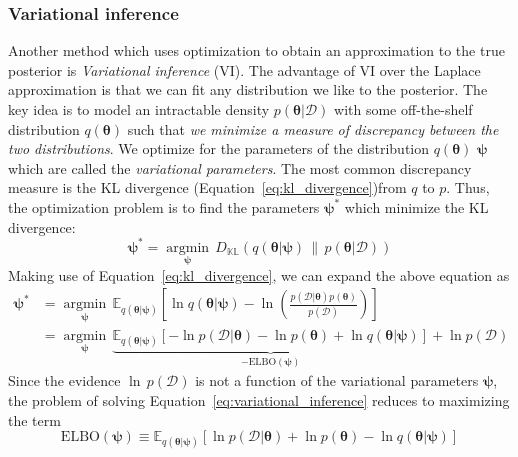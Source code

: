 \documentclass[12pt,dvipsnames]{report}
\renewcommand{\vec}[1]{\boldsymbol{\mathbf{#1}}}
\begin{document}
\subsubsection{Variational inference}
Another method which uses optimization to obtain an approximation to the true
posterior is \emph{Variational inference} (VI). The advantage of VI over the
Laplace approximation is that we can fit any distribution we like to the
posterior. The key idea is to model an intractable density $p(\vec{\theta}
    \lvert\mathcal{D})$ with some off-the-shelf distribution $q(\vec{\theta})$ such
that \emph{we minimize a measure of discrepancy between the two distributions}.
We optimize for the parameters of the distribution $q(\vec{\theta})$
$\vec{\psi}$ which are called the \textsl{variational parameters}. The most
common discrepancy measure is the KL divergence
(Equation~\ref{eq:kl_divergence})from $q$ to $p$. Thus, the optimization
problem is to find the parameters $\vec{\psi}^*$ which minimize the KL
divergence:
\begin{equation}
    \boldsymbol{\psi}^{*}=\underset{\boldsymbol{\psi}}{\operatorname{argmin}}\,D_{\mathbb{K} \mathbb{L}}(q(\boldsymbol{\theta} \lvert\boldsymbol{\psi})\, \|\, p(\boldsymbol{\theta} \lvert\mathcal{D}))
    \label{eq:variational_inference}
\end{equation}
Making use of Equation~\ref{eq:kl_divergence}, we can expand the above equation as \citep{murphy_book_2022}
\begin{align}
    \vec{\psi}^* & =\underset{\vec{\psi}}{\operatorname{argmin}}\, \mathbb{E}_{q(\boldsymbol{\theta} \lvert\boldsymbol{\psi})}\left[\ln q(\boldsymbol{\theta} \lvert\boldsymbol{\psi})-\ln \left(\frac{p(\mathcal{D} \lvert\boldsymbol{\theta}) p(\boldsymbol{\theta})}{p(\mathcal{D})}\right)\right]                           \\
                 & =\underset{\vec{\psi}}{\operatorname{argmin}} \,\underbrace{\mathbb{E}_{q(\boldsymbol{\theta} \lvert\boldsymbol{\psi})}[-\ln p(\mathcal{D} \lvert\boldsymbol{\theta})-\ln p(\boldsymbol{\theta})+\ln q(\boldsymbol{\theta} \lvert\boldsymbol{\psi})]}_{-\mathrm{ELBO}(\boldsymbol{\psi})}+\ln p(\mathcal{D})
\end{align}
Since the evidence $\ln\,p(\mathcal{D})$ is not a function of the variational parameters
$\vec{\psi}$, the problem of solving Equation~\ref{eq:variational_inference} reduces
to maximizing the term
\begin{equation}
    \mathrm{ELBO}(\boldsymbol{\psi}) \equiv \mathbb{E}_{q(\boldsymbol{\theta} \lvert\boldsymbol{\psi})}[\ln p(\mathcal{D} \lvert\boldsymbol{\theta})+\ln p(\boldsymbol{\theta})-\ln q(\boldsymbol{\theta} \lvert\boldsymbol{\psi})]
\end{equation}
\end{document}
